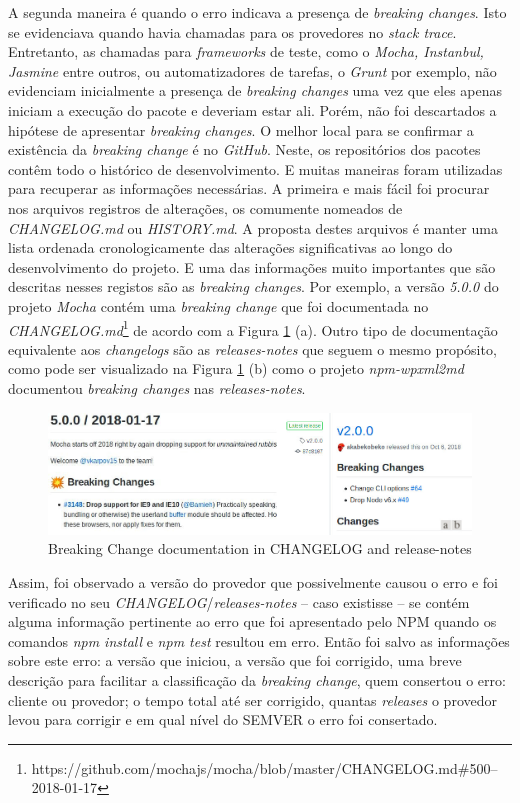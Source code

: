A segunda maneira é quando o erro indicava a presença de \textit{breaking changes}. Isto se evidenciava quando havia chamadas para os provedores no \textit{stack trace}. Entretanto, as chamadas para \textit{frameworks} de teste, como o \textit{Mocha, Instanbul, Jasmine} entre outros, ou automatizadores de tarefas, o \textit{Grunt} por exemplo, não evidenciam inicialmente a presença de \textit{breaking changes} uma vez que eles apenas iniciam a execução do pacote e deveriam estar ali. Porém, não foi descartados a hipótese de apresentar \textit{breaking changes}. O melhor local para se confirmar a existência da \textit{breaking change} é no \textit{GitHub}. Neste, os repositórios dos pacotes contêm todo o histórico de desenvolvimento. E muitas maneiras foram utilizadas para recuperar as informações necessárias. A primeira e mais fácil foi procurar nos arquivos registros de alterações, os comumente nomeados de \textit{CHANGELOG.md} ou \textit{HISTORY.md}. A proposta destes arquivos é manter uma lista ordenada cronologicamente das alterações significativas ao longo do desenvolvimento do projeto. E uma das informações muito importantes que são descritas nesses registos são as \textit{breaking changes}. Por exemplo, a versão \textit{5.0.0} do projeto \textit{Mocha} contém uma \textit{breaking change} que foi documentada no \textit{CHANGELOG.md}\footnote{https://github.com/mochajs/mocha/blob/master/CHANGELOG.md\#500--2018-01-17} de acordo com a Figura \ref{fig:bc_documentation} (a). Outro tipo de documentação equivalente aos \textit{changelogs} são as \textit{releases-notes} que seguem o mesmo propósito, como pode ser visualizado na Figura \ref{fig:bc_documentation} (b) como o projeto \textit{npm-wpxml2md} documentou \textit{breaking changes} nas \textit{releases-notes}.

\begin{figure}
    \centering
    \includegraphics[scale=0.45]{figuras/bc_documentation.jpeg}
    \caption{Breaking Change documentation in CHANGELOG and release-notes}
    \label{fig:bc_documentation}
\end{figure}{}

Assim, foi observado a versão do provedor que possivelmente causou o erro e foi verificado no seu \textit{CHANGELOG}/\textit{releases-notes} -- caso existisse -- se contém alguma informação pertinente ao erro que foi apresentado pelo \gls{NPM} quando os comandos \textit{npm install} e \textit{npm test} resultou em erro. Então foi salvo as informações sobre este erro: a versão que iniciou, a versão que foi corrigido, uma breve descrição para facilitar a classificação da \textit{breaking change}, quem consertou o erro: cliente ou provedor; o tempo total até ser corrigido, quantas \textit{releases} o provedor levou para corrigir e em qual nível do \gls{SEMVER} o erro foi consertado.

